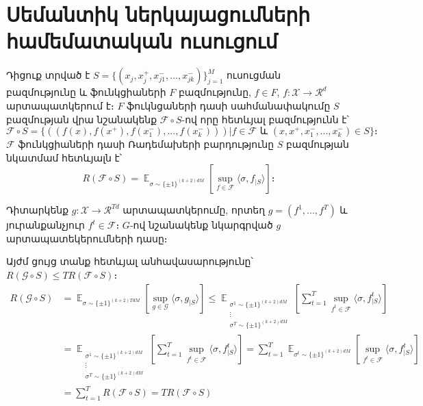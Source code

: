 \documentclass[11pt]{article}
\DeclareMathOperator*{\E}{\mathbb{E}}
\begin{document}
\section*{\hfill Սեմանտիկ ներկայացումների համեմատական ուսուցում \hfill} \noindent


Դիցուք տրված  է $S =\{(x_j, x^+_j, x^-_{j1}, ..., x^-_{jk})\}_{j=1}^M$ ուսուցման բազմությունը և ֆունկցիաների $F$ բազմությունը, $f \in F$, $f: \mathcal{X} \to \mathcal{R}^d$ արտապատկերում է։ $F$ ֆուկնցաների դասի սահմանափակումը $S$ բազմության վրա  նշանակենք $\mathcal{F} \circ S$-ով որը հետևյալ բազմությունն է՝
$$\mathcal{F} \circ S = \{((f(x), f(x^+), f(x^-_{1}), ..., f(x^-_{k}))) | f \in \mathcal{F} \text{ և }  (x, x^+, x^-_{1}, ..., x^-_{k}) \in S \}։$$
$\mathcal{F}$ ֆունկցիաների դասի Ռադեմախերի բարդությունը $S$ բազմության նկատմամ հետևյալն է՝
$$R(\mathcal{F} \circ S) = \E_{\sigma \sim \{\pm 1\} ^ {(k+2)dM}} \left [{\sup_{f \in \mathcal{F}}{\langle \sigma, f_{|S} \rangle}} \right]։$$ 
\par Դիտարկենք $g:\mathcal{X} \to \mathcal{R}^{Td}$ արտապատկերումը, որտեղ  $g = (f^1, ..., f^T)$ և յուրանքանչյուր $f^t \in \mathcal{F}$։ $G$-ով նշանակենք նկարգրված $g$ արտապատեկերումների դասը։ 

Այժմ ցույց տանք հետևյալ անհավասարությունը՝ $R(\mathcal{G} \circ S) \leq TR(\mathcal{F} \circ S)$։
\begin{align*}
R(\mathcal{G} \circ S) &= \E_{\sigma \sim \{\pm 1\} ^ {(k+2)TdM}} \left [{\sup_{g \in \mathcal{G}}{\langle \sigma, g_{|S} \rangle}} \right] \leq \E_{\substack{\sigma^1 \sim \{\pm 1\} ^ {(k+2)dM} \\ \vdots \\ \sigma^T \sim \{\pm 1\} ^ {(k+2)dM}}} \left [{\sum_{t=1}^T\sup_{f^t \in \mathcal{F}}{\langle \sigma, f^t_{|S} \rangle}}\right] \\
&= \E_{\substack{\sigma^1 \sim \{\pm 1\} ^ {(k+2)dM} \\ \vdots \\ \sigma^T \sim \{\pm 1\} ^ {(k+2)dM}}} \left [{\sum_{t=1}^T\sup_{f^t \in \mathcal{F}}{\langle \sigma, f^t_{|S} \rangle}}\right] 
=\sum_{t=1}^T \E_{\sigma^t \sim \{\pm 1\} ^ {(k+2)dM} } \left [{\sup_{f^t \in \mathcal{F}}{\langle \sigma, f^t_{|S} \rangle}}\right]  \\
&= \sum_{t=1}^T R(\mathcal{F} \circ S) = TR(\mathcal{F} \circ S)
 \end{align*}
{}


\pagebreak
\end{document}
